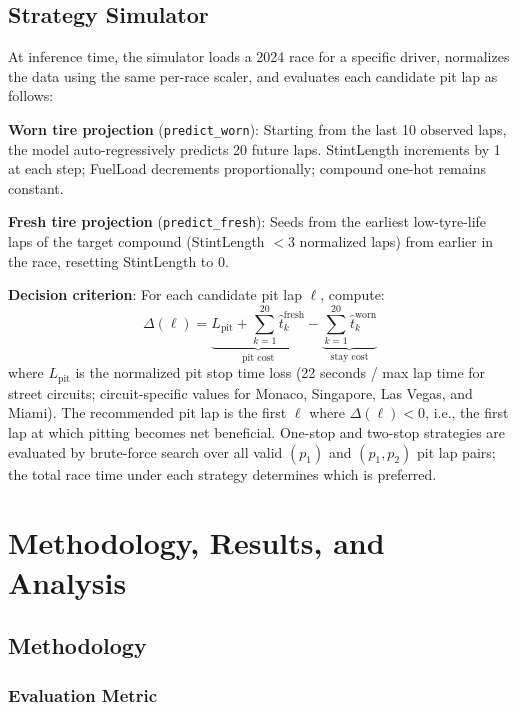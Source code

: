 \documentclass[12pt]{article}
\begin{document}
\subsection{Strategy Simulator}

At inference time, the simulator loads a 2024 race for a specific driver, normalizes the data using the same per-race scaler, and evaluates each candidate pit lap as follows:

\textbf{Worn tire projection} (\texttt{predict\_worn}): Starting from the last 10 observed laps, the model auto-regressively predicts 20 future laps. StintLength increments by 1 at each step; FuelLoad decrements proportionally; compound one-hot remains constant.

\textbf{Fresh tire projection} (\texttt{predict\_fresh}): Seeds from the earliest low-tyre-life laps of the target compound (StintLength $< 3$ normalized laps) from earlier in the race, resetting StintLength to 0.

\textbf{Decision criterion}: For each candidate pit lap $\ell$, compute:
\begin{equation}
\Delta(\ell) = \underbrace{L_\text{pit} + \sum_{k=1}^{20} \hat{t}_k^\text{fresh}}_{\text{pit cost}} - \underbrace{\sum_{k=1}^{20} \hat{t}_k^\text{worn}}_{\text{stay cost}}
\end{equation}
where $L_\text{pit}$ is the normalized pit stop time loss (22 seconds / max lap time for street circuits; circuit-specific values for Monaco, Singapore, Las Vegas, and Miami). The recommended pit lap is the first $\ell$ where $\Delta(\ell) < 0$, i.e., the first lap at which pitting becomes net beneficial. One-stop and two-stop strategies are evaluated by brute-force search over all valid $(p_1)$ and $(p_1, p_2)$ pit lap pairs; the total race time under each strategy determines which is preferred.

\section{Methodology, Results, and Analysis}

\subsection{Methodology}

\subsubsection{Evaluation Metric}
\end{document}
